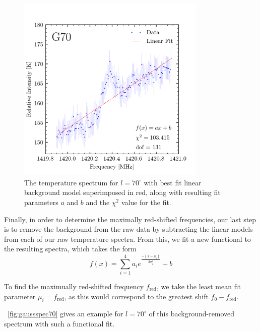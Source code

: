 \documentclass[aps,twocolumn,secnumarabic,balancelastpage,amsmath,amssymb,nofootinbib, floatfix]{revtex4-2}
\begin{document}
	\begin{figure}[h]
		\centering
		\includegraphics[width=9cm]{spec_linfit_70.png}
		\caption{The temperature spectrum for $l=70^{\circ}$ with best fit linear background model superimposed in red, along with resulting fit parameters $a$ and $b$ and the $\chi^{2}$ value for the fit.}
		\label{fig:linspec70}
	\end{figure}
	
	Finally, in order to determine the maximally red-shifted frequencies, our last step is to remove the background from the raw data by subtracting the linear models from each of our raw temperature spectra. From this, we fit a new functional to the resulting spectra, which takes the form
	\begin{equation}
		f(x)=\sum_{i=1}^{4}a_{i}e^{\frac{-(x-\mu_{i})}{2\sigma_{i}^{2}}} + b
	\end{equation} 
	
	To find the maximually red-shifted frequency $f_{\mathrm{red}}$, we take the least mean fit parameter $\mu_{i}=f_{\mathrm{red}}$, as this would correspond to the greatest shift $f_{0}-f_{\mathrm{red}}$.
	
	~\ref{fig:gaussspec70} gives an example for $l=70^{\circ}$ of this background-removed spectrum with such a functional fit. 
	
\end{document}
